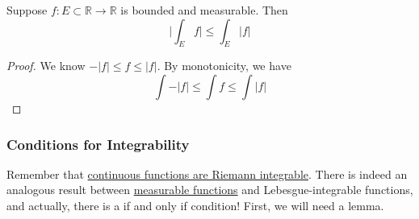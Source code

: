   \begin{corollary}
    \label{thm:integral-triangle-inequality}
    Suppose $f: E \subset \mathbb{R} \to \mathbb{R}$ is bounded and measurable. Then 
    \begin{equation}
      \bigg| \int_E f \bigg| \leq \int_E |f| 
    \end{equation}
  \end{corollary} 
  \begin{proof}
    We know $-|f| \leq f \leq |f|$. By monotonicity, we have 
    \begin{equation}
      \int -|f| \leq \int f \leq \int |f|
    \end{equation}
  \end{proof} 

\subsubsection{Conditions for Integrability}
  
  Remember that \hyperref[real-thm:continuous-riemann]{continuous functions are Riemann integrable}. There is indeed an analogous result between \hyperref[def:measurable-function]{measurable functions} and Lebesgue-integrable functions, and actually, there is a if and only if condition! First, we will need a lemma. 

